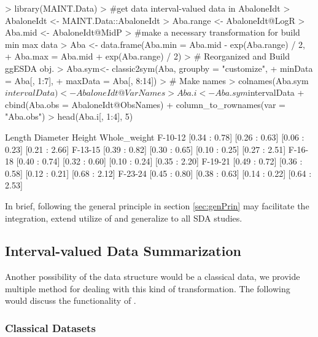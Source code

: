 \documentclass[article]{jss}
\begin{document}
\begin{Schunk}
\begin{Sinput}
> library(MAINT.Data)
> #get data interval-valued data in AbaloneIdt
> AbaloneIdt <- MAINT.Data::AbaloneIdt
> Aba.range <- AbaloneIdt@LogR
> Aba.mid <- AbaloneIdt@MidP
> #make a necessary transformation for build min max data
> Aba <- data.frame(Aba.min = Aba.mid - exp(Aba.range) / 2,
+                   Aba.max = Aba.mid + exp(Aba.range) / 2)
> # Reorganized and Build ggESDA obj.
> Aba.sym<- classic2sym(Aba, groupby = "customize",
+                       minData = Aba[, 1:7],
+                       maxData = Aba[, 8:14])
> # Make names
> colnames(Aba.sym$intervalData) <- AbaloneIdt@VarNames
> Aba.i <- Aba.sym$intervalData %
+   cbind(Aba.obs = AbaloneIdt@ObsNames) %
+   column_to_rownames(var = "Aba.obs")
> head(Aba.i[, 1:4], 5)
\end{Sinput}
\begin{Soutput}
               Length      Diameter        Height  Whole_weight
F-10-12 [0.34 : 0.78] [0.26 : 0.63] [0.06 : 0.23] [0.21 : 2.66]
F-13-15 [0.39 : 0.82] [0.30 : 0.65] [0.10 : 0.25] [0.27 : 2.51]
F-16-18 [0.40 : 0.74] [0.32 : 0.60] [0.10 : 0.24] [0.35 : 2.20]
F-19-21 [0.49 : 0.72] [0.36 : 0.58] [0.12 : 0.21] [0.68 : 2.12]
F-23-24 [0.45 : 0.80] [0.38 : 0.63] [0.14 : 0.22] [0.64 : 2.53]
\end{Soutput}
\end{Schunk}

In brief, following the general principle in section \ref{sec:genPrin} may facilitate the integration, extend utilize of  and generalize to all SDA studies.

\subsection{Interval-valued Data Summarization}

Another possibility of the data structure would be a classical data, we provide multiple method for dealing with this kind of transformation. The following would discuss the functionality of .

\subsubsection{Classical Datasets}
\end{document}
